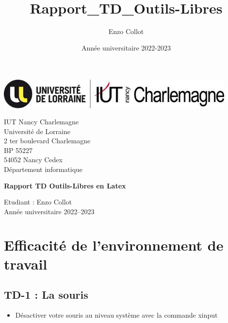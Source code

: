 \documentclass[12pt]{article}
\title{Rapport_TD_Outils-Libres}
\author{Enzo Collot}
\date{Année universitaire 2022-2023}
\begin{document}
    \thispagestyle{empty}
    \begin{center}
        \includegraphics[width=12cm]{Images-TD-Env-Efficiency/Image-TD-1/logo_iut.jpg}
        \end{center}

\vspace{1cm}

\noindent
{\large
  IUT Nancy Charlemagne\\
  Université de Lorraine\\
  2 ter boulevard Charlemagne\\
  BP 55227\\
  54052 Nancy Cedex\\[5mm]
  Département informatique
}

\vspace{5cm}

\begin{center}
    {\huge
      \textbf{Rapport TD Outils-Libres en Latex}
    }
\end{center}

\vspace{5cm}

\vfill


{\Large
  \noindent
  Etudiant : Enzo Collot\\
  Année universitaire 2022--2023
}

\newpage
\thispagestyle{empty}
\mbox{}
\newpage

\newpage
\tableofcontents

\newpage

\section{Efficacité de l'environnement de travail}

  \subsection{TD-1 : La souris}

\begin{itemize}
  \item Désactiver votre souris au niveau système avec la commande xinput
\end{itemize}
\end{document}
